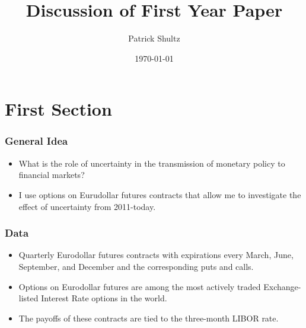 \documentclass{beamer}
\title[]{Discussion of First Year Paper} %
\author{Patrick Shultz} %
\date{\today} %
\begin{document}


\section{First Section} %

\begin{frame}
\frametitle{General Idea}
\begin{itemize}
\item What is the role of uncertainty in the transmission of monetary policy to financial markets?



\item I use options on Eurudollar futures contracts that allow me to investigate the effect of uncertainty from 2011-today. 

\end{itemize}
\end{frame}


\begin{frame}
\frametitle{Data}
\begin{itemize}
	\item Quarterly Eurodollar futures contracts with expirations every March, June, September, and December and the corresponding puts and calls.
	\item Options on Eurodollar futures are among the most actively traded Exchange-listed Interest Rate options in the world. 
	\item The payoffs of these contracts are tied to the three-month LIBOR rate. 
    

\end{itemize}

\end{frame}

\end{document}
